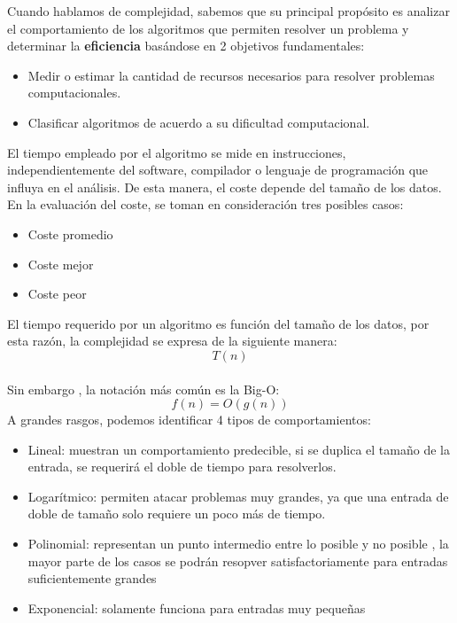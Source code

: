 \documentclass{article}
\begin{document}
Cuando hablamos de complejidad, sabemos que su principal propósito es analizar el comportamiento de los algoritmos que permiten resolver un problema y determinar la \textbf{eficiencia} basándose en 2 objetivos fundamentales:
\begin{itemize}
    \item Medir o estimar la cantidad de recursos necesarios para resolver problemas computacionales.
    \item Clasificar algoritmos de acuerdo a su dificultad computacional.
\end{itemize}

El tiempo empleado por el algoritmo se mide en instrucciones, independientemente del software, compilador o lenguaje de programación que influya en el análisis. De esta manera, el coste depende del tamaño de los datos. En la evaluación del coste, se toman en consideración tres posibles casos:
\begin{itemize}
    \item Coste promedio
    \item Coste mejor
    \item Coste peor
\end{itemize}

El tiempo requerido por un algoritmo es función del tamaño de los datos, por esta razón, la complejidad se expresa de la siguiente manera:
$$
T(n)
$$
\\
Sin embargo , la notación más común es la Big-O:
$$
f(n) = O(g(n))
$$
A grandes rasgos, podemos identificar 4 tipos de comportamientos:
\begin{itemize}
    \item Lineal: muestran un comportamiento predecible, si se duplica el tamaño de la entrada, se requerirá el doble de tiempo para resolverlos.
    \item Logarítmico: permiten atacar problemas muy grandes, ya que una entrada de doble de tamaño solo requiere un poco más de tiempo.
    \item Polinomial: representan un punto intermedio entre lo posible y no posible , la mayor parte de los casos se podrán resopver satisfactoriamente para entradas suficientemente grandes
    \item Exponencial: solamente funciona para entradas muy pequeñas
\end{itemize}
\end{document}
